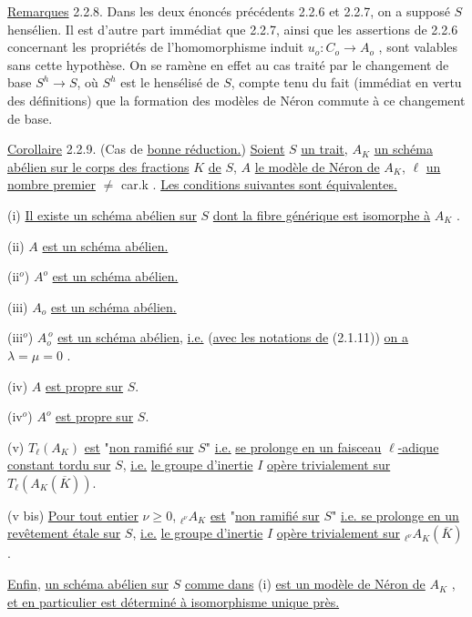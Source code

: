 \underline{Remarques} 2.2.8. Dans les deux énoncés précédents 2.2.6 et 2.2.7, on a supposé $S$ hensélien. Il est d'autre part immédiat que 2.2.7, ainsi que les assertions de 2.2.6 concernant les propriétés de l'homomorphisme induit $u_{o} : C_{o} \longrightarrow A_{o}$ , sont valables sans cette hypothèse. On se ramène en effet au cas traité par le changement de base $S^{h} \longrightarrow S$, où $S^{h}$ est le hensélisé de $S$, compte tenu du fait (immédiat en vertu des définitions) que la formation des modèles de Néron commute à ce changement de base.



\underline{Corollaire} 2.2.9. (Cas de \underline{bonne réduction.}) \underline{Soient} $S$ \underline{un trait}, $A_K$ \underline{un schéma abélien sur le corps des fractions} $K$ \underline{de} $S$, $A$ \underline{le modèle de Néron de} $A_K$, $\ell$ \underline{un nombre premier} $\neq$ car.k . \underline{Les conditions suivantes sont équivalentes.}

(i) \underline{Il existe un schéma abélien sur} $S$ \underline{dont la fibre générique est isomorphe à} $A_K$ .

(ii) $A$ \underline{est un schéma abélien.}

(ii$^o$) $A^o$ \underline{est un schéma abélien.}

(iii) $A_o$ \underline{est un schéma abélien.}

(iii$^o$) $A_o^{\,o}$ \underline{est un schéma abélien}, \underline{i.e.} (\underline{avec les notations de} (2.1.11)) \underline{on a} $\lambda = \mu = 0$ .

(iv) $A$ \underline{est propre sur} $S$.

(iv$^o$) $A^o$ \underline{est propre sur} $S$.

(v) $T_\ell(A_K)$ \underline{est} "\underline{non ramifié sur} $S$" \underline{i.e.} \underline{se prolonge en un faisceau} $\ell$\underline{-adique constant tordu sur} $S$, \underline{i.e.} \underline{le groupe d'inertie} $I$ \underline{opère trivialement sur} $T_\ell(A_K(\overline{K}))$.

(v bis) \underline{Pour tout entier} $\nu \geq 0$, ${}_{\ell^\nu}A_K$ \underline{est} "\underline{non ramifié sur} $S$" \underline{i.e. se prolonge en un revêtement étale sur} $S$, \underline{i.e.} \underline{le groupe d'inertie} $I$ \underline{opère trivialement sur} ${}_{\ell^\nu}A_K(\overline{K})$.

\underline{Enfin}, \underline{un schéma abélien sur} $S$ \underline{comme dans} (i) \underline{est un modèle de Néron de} $A_K$ , \underline{et en particulier est déterminé à isomorphisme unique près.}

